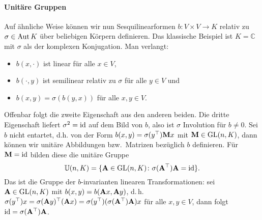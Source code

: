 \paragraph{Unitäre Gruppen} Auf ähnliche Weise können wir nun Sesquilinearformen $b: V \times V \to K$ relativ zu $\sigma \in \operatorname{Aut} K$ über beliebigen Körpern definieren. Das klassische Beispiel ist $K = \mathbb C$ mit $\sigma$ als der komplexen Konjugation. Man verlangt:
\begin{itemize}
\item $b(x, \cdot)$ ist linear für alle $x \in V$,
\item $b(\cdot, y)$ ist semilinear relativ zu $\sigma$ für alle $y \in V$ und
\item $b(x,y) = \sigma(b(y,x))$ für alle $x,y \in V$.
\end{itemize}
Offenbar folgt die zweite Eigenschaft aus den anderen beiden. Die dritte Eigenschaft liefert $\sigma^2 = \operatorname{id}$ auf dem Bild von $b$, also ist $\sigma$ Involution für $b \neq 0$. Sei $b$ nicht entartet, d.h. von der Form $b(x,y) = \sigma(y^\top) \mathbf{M} x$ mit $\mathbf{M} \in \mathrm{GL}(n,K)$, dann können wir unitäre Abbildungen bzw.~Matrizen bezüglich $b$ definieren. Für $\mathbf{M} = \operatorname{id}$ bilden diese die unitäre Gruppe
\begin{equation}
\mathbb U(n,K) = \{ \mathbf{A} \in \mathrm{GL}(n,K) \colon \sigma(\mathbf{A}^\top) \mathbf{A} = \operatorname{id} \}.
\end{equation}
Das ist die Gruppe der $b$-invarianten linearen Transformationen: sei $\mathbf{A} \in \mathrm{GL}(n,K)$ mit $b(x,y) = b(\mathbf{A}x, \mathbf{A}y)$, d.\,h. $\sigma(y^\top) x = \sigma(\mathbf{A}y)^\top (\mathbf{A}x) = \sigma(y^\top) (\sigma(\mathbf{A}^\top) \mathbf{A}) x$ für alle $x, y \in V$, dann folgt $\operatorname{id} = \sigma(\mathbf{A}^\top) \mathbf{A}$.

